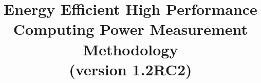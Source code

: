 \documentclass[runningheads]{scrreprt}
\begin{document}
\graphicspath{{figures/}}

\pagestyle{headings}  %

\title{
Energy Efficient High Performance Computing Power Measurement Methodology \\
\bigskip
\normalsize{(version 1.2RC2)}
}


\date{ }
\maketitle              %

\tableofcontents
\listoftables
\listoffigures

%



\newpage




\end{document}
